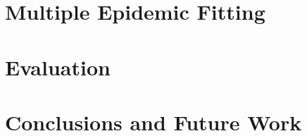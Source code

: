 \documentclass[11pt, a4paper, oneside,titlepage]{article}
\begin{document}
\subsection{}



\newpage
\section{Multiple Epidemic Fitting}


\newpage
\section{Evaluation}


\newpage
\section{Conclusions and Future Work}
\end{document}
